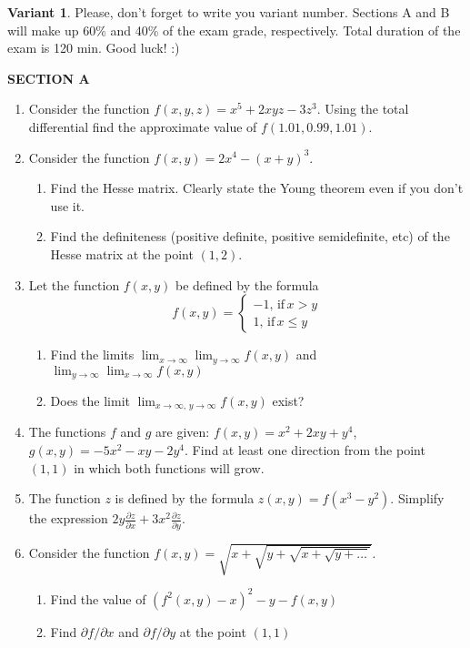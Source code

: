 \documentclass[12pt,a4paper]{article}
\begin{document}
\thispagestyle{empty}
\textbf{Variant 1}. Please, don't forget to write you variant number. Sections A and B will make up 60\% and 40\% of the exam grade, respectively. Total duration of the exam is 120 min. Good luck! :) 



\textbf{SECTION A}

\begin{enumerate}

\item Consider the function $f(x,y,z)=x^5+2xyz-3z^3$. Using the total differential find the approximate value of $f(1.01,0.99,1.01)$.

\item Consider the function $f(x,y)=2x^4-(x+y)^3$. 
\begin{enumerate}
\item Find the Hesse matrix. Clearly state the Young theorem even if you don't use it.
\item Find the definiteness (positive definite, positive semidefinite, etc) of the Hesse matrix at the point $(1,2)$.
\end{enumerate}

\item Let the function $f(x,y)$ be defined by the formula
\[
f(x,y)=\begin{cases}
-1, \, \text{if} \, x>y \\
1, \, \text{if} \, x\leq y
\end{cases}
\]

\begin{enumerate}
\item Find the limits $\lim_{x\to\infty}\lim_{y\to \infty} f(x,y)$ and $\lim_{y\to\infty}\lim_{x\to \infty} f(x,y)$
\item Does the limit $\lim_{x\to\infty, \, y\to \infty} f(x,y)$ exist?
\end{enumerate}


\item The functions $f$ and $g$ are given: $f(x,y)=x^2+2xy+y^4$, $g(x,y)=-5x^2-xy-2y^4$. Find at least one direction from the point $(1,1)$ in which both functions will grow.

\item The function $z$ is defined by the formula $z(x,y)=f(x^3-y^2)$. Simplify the expression $2y\frac{\partial z}{\partial x}+3x^2\frac{\partial z}{\partial y}$. 

\item Consider the function $f(x,y)=\sqrt{x+\sqrt{y+\sqrt{x+\sqrt{y + \ldots }}}}$. 
\begin{enumerate}
\item Find the value of $(f^2(x,y)-x)^2-y-f(x,y)$
\item Find $\partial f/\partial x$ and $\partial f/\partial y$ at the point $(1,1)$
\end{enumerate}


\end{enumerate}
\end{document}
